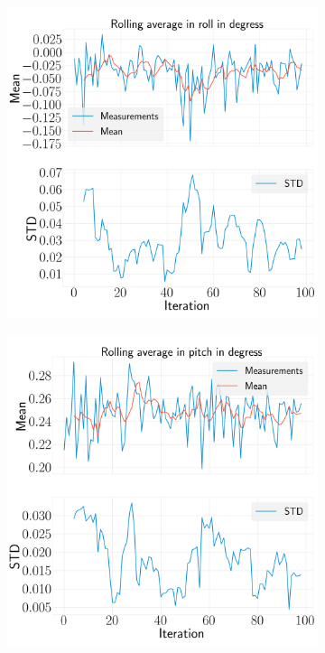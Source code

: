 \documentclass[../Head/report.tex]{subfiles}
\begin{document}
\begin{figure}[H]
    \centering
    \begin{subfigure}[t]{.30\textwidth}
        \centering
        \includegraphics[width=\textwidth]{../Figures/analyse_rolling_average/test2/Calculated_rolling_average_in_roll_with_mean_and_STD.png}
        \caption{}
        \label{fig:GPS2Vision_pose_estimation_test2_roll}
    \end{subfigure}
     \hspace{0.2em}
    \begin{subfigure}[t]{.30\textwidth}
        \centering
        \includegraphics[width=\textwidth]{../Figures/analyse_rolling_average/test2/Calculated_rolling_average_in_pitch_with_mean_and_STD.png}

\end{subfigure}
\end{figure}
\end{document}
